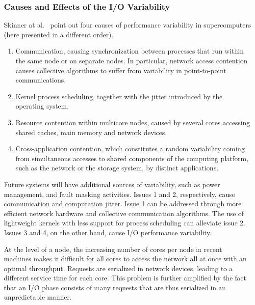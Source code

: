 			
		\subsubsection{Causes and Effects of the I/O Variability}
		
			Skinner at al.~\cite{skinner2005understanding} point out four causes of 
			performance variability in supercomputers (here presented in a different order).
%
			\begin{enumerate}
			
			\item Communication, causing synchronization between
			processes that run within the same node or on separate nodes. In
			particular, network access contention causes collective
			algorithms to suffer from variability in point-to-point communications.
			
			\item Kernel process scheduling, together with the jitter introduced by
			the operating system.
			
			\item Resource contention within multicore nodes, caused by
			several cores accessing shared caches, main memory and network devices.
			
			\item Cross-application contention, which constitutes a random
			variability coming from simultaneous accesses to shared components of the
			computing platform, such as the network or the storage system, by distinct applications.
		
			\end{enumerate}
%
			Future systems will have additional sources of variability, such as power management, and fault masking activities.
			Issues 1 and 2, respectively, cause communication and computation jitter.
			Issue 1 can be addressed through more efficient network hardware 
			and collective communication algorithms. The use of 
			lightweight kernels with less support for process scheduling can alleviate issue 2. 
			Issues 3 and 4, on the other hand, cause I/O performance variability.
		
			At the level of a node, the increasing number of cores per node in recent machines makes 
			it difficult for all cores to access the network all at once with an optimal 
			throughput. Requests are serialized in network devices, leading to a different service
			time for each core. This problem is further amplified by the fact that an I/O 
			phase consists of many requests that are thus serialized in an unpredictable manner.


